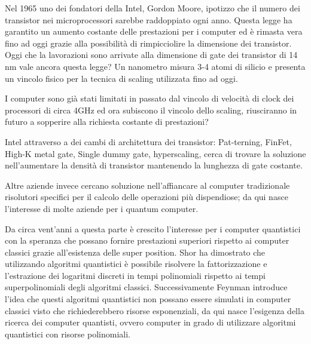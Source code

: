 Nel 1965 uno dei fondatori della Intel, Gordon Moore, ipotizzo che il numero dei transistor nei microprocessori sarebbe raddoppiato ogni anno. Questa legge ha garantito un aumento costante delle prestazioni per i computer ed è rimasta vera fino ad oggi grazie alla possibilità di rimpicciolire la dimensione dei transistor. Oggi che la lavorazioni sono arrivate alla dimensione di gate dei transistor di 14 nm vale ancora questa legge? Un nanometro misura 3-4 atomi di silicio e presenta un vincolo fisico per la tecnica di scaling utilizzata fino ad oggi.

I computer sono già stati limitati in passato dal vincolo di velocità di clock dei processori di circa 4GHz ed ora subiscono il vincolo dello scaling, riusciranno in futuro a sopperire alla richiesta costante di prestazioni?

\cite{s24}Intel attraverso a dei cambi di architettura dei transistor: Pat-terning, FinFet, High-K metal gate, Single dummy gate, hyperscaling, cerca di trovare la soluzione nell'aumentare la densità di transistor mantenendo la lunghezza di gate costante.

Altre aziende invece cercano soluzione nell'affiancare al computer tradizionale risolutori specifici per il calcolo delle operazioni più dispendiose; da qui nasce l'interesse di molte aziende per i quantum computer.

\cite{nac}Da circa vent'anni a questa parte è crescito l'interesse per i computer quantistici con la speranza che possano fornire prestazioni superiori rispetto ai computer classici grazie all'esistenza delle super position. Shor ha dimostrato che utilizzando algoritmi quantistici è possibile risolvere la fattorizzazione e l'estrazione dei logaritmi discreti in tempi polinomiali rispetto ai tempi superpolinomiali degli algoritmi classici. Successivamente Feynman introduce l'idea che questi algoritmi quantistici non possano essere simulati in computer classici visto che richiederebbero risorse esponenziali, da qui nasce l'esigenza della ricerca dei computer quantisti, ovvero computer in grado di utilizzare algoritmi quantistici con risorse polinomiali.
